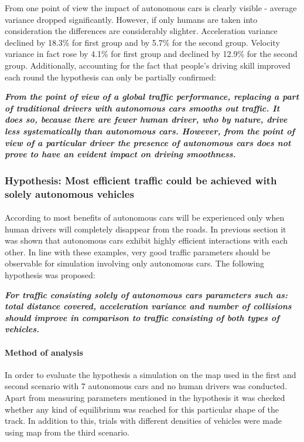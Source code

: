 \documentclass[11pt,english]{article}
\begin{document}
From one point of view the impact of autonomous cars is clearly visible - average variance dropped significantly. However, if only humans are taken into consideration the differences are considerably slighter. Acceleration variance declined by 18.3\% for first group and by 5.7\% for the second group. Velocity variance in fact rose by 4.1\% for first group and declined by 12.9\% for the second group. Additionally, accounting for the fact that people's driving skill improved each round the hypothesis can only be partially confirmed:

\textbf{\textit{From the point of view of a global traffic performance, replacing a part of traditional drivers with autonomous cars smooths out traffic. It does so, because there are fewer human driver, who by nature, drive less systematically than autonomous cars. However, from the point of view of a particular driver the presence of autonomous cars does not prove to have an evident impact on driving smoothness.}}





\subsubsection{Hypothesis: Most efficient traffic could be achieved with solely autonomous vehicles}
\paragraph{}
According to \citet{litman2014autonomous} most benefits of autonomous cars will be experienced only when human drivers will completely disappear from the roads. In previous section it was shown that autonomous cars exhibit highly efficient interactions with each other. In line with these examples, very good traffic parameters should be observable for simulation involving only autonomous cars. The following hypothesis was proposed:

\textbf{\textit{For traffic consisting solely of autonomous cars parameters such as: total distance covered, acceleration variance and number of collisions should improve in comparison to traffic consisting of both types of vehicles.}}

\paragraph{Method of analysis}
In order to evaluate the hypothesis a simulation on the map used in the first and second scenario with 7 autonomous cars and no human drivers was conducted. Apart from measuring parameters mentioned in the hypothesis it was checked whether any kind of equilibrium was reached for this particular shape of the track. In addition to this, trials with different densities of vehicles were made using map from the third scenario. 
\end{document}
